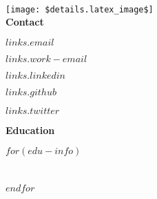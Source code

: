 \documentclass{article}
\begin{document}
    \begin{multicols}{2}
            \normalfont
            \pagecolor{navbar}
            \vspace{12mm}
            {\huge {}}
            \vspace{10mm}\\
            \texttt{[image: \$details.latex\_image\$]} \\


            \vspace{10mm}
            \noindent
            {\Large {\color{header}\textbf{Contact}}}
            
            \vspace{3mm}
            \textcolor{secondary}{$links.email$}
            \vspace{2mm}
            
            \textcolor{secondary}{$links.work-email$}
            \vspace{2mm}

            \textcolor{secondary}{\href{https://www.linkedin.com/in/$links.linkedin$}{$links.linkedin$}}
            \vspace{2mm}

            \textcolor{secondary}{\href{https://github.com/$links.github$}{$links.github$}}
            \vspace{2mm}

            \textcolor{secondary}{\href{$links.twitter_link$}{$links.twitter$}}
            \vspace{2mm}

            \vspace{7mm}
            \noindent
            {\Large {\color{header}\textbf{Education}}}

            \vspace{3mm}
            $for(edu-info)$
                \noindent
                \\
                \color{secondary}{$edu-info.university$}\\
                \color{secondary}{$edu-info.years$}\\
                \vspace{5mm}
            $endfor$


\end{multicols}
\end{document}
